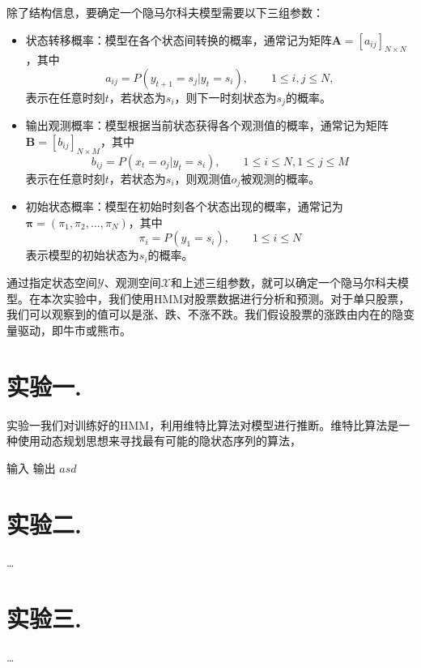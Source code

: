 \documentclass[a4paper,UTF8]{article}
\theoremstyle{definition}
\begin{document}
	除了结构信息，要确定一个隐马尔科夫模型需要以下三组参数：
\begin{itemize}
\item
	状态转移概率：模型在各个状态间转换的概率，通常记为矩阵$\textbf{A}=[a_{ij}]_{N\times N}$，其中
\begin{displaymath}
	a_{ij}=P(y_{t+1}=s_j|y_t=s_i),\qquad 1 \leq i,j \leq N,
\end{displaymath}
表示在任意时刻$t$，若状态为$s_i$，则下一时刻状态为$s_j$的概率。
\item
	输出观测概率：模型根据当前状态获得各个观测值的概率，通常记为矩阵$\textbf{B}=[b_{ij}]_{N\times M}$，其中
\begin{displaymath}
	b_{ij}=P(x_t=o_j|y_t=s_i),\qquad 1 \leq i \leq N, 1\leq j \leq M
\end{displaymath}
表示在任意时刻$t$，若状态为$s_i$，则观测值$o_j$被观测的概率。
\item
     初始状态概率：模型在初始时刻各个状态出现的概率，通常记为$\boldsymbol{\pi}=(\pi_1,\pi_2,...,\pi_N)$，其中
\begin{displaymath}
	\pi_i=P(y_1=s_i),\qquad 1\leq i \leq N
\end{displaymath}
表示模型的初始状态为$s_i$的概率。
\end{itemize}

	通过指定状态空间$\mathcal{Y}$、观测空间$\mathcal{X}$和上述三组参数，就可以确定一个隐马尔科夫模型。在本次实验中，我们使用HMM对股票数据进行分析和预测。对于单只股票，我们可以观察到的值可以是涨、跌、不涨不跌。我们假设股票的涨跌由内在的隐变量驱动，即牛市或熊市。

\section*{实验一.}
	实验一我们对训练好的HMM，利用维特比算法对模型进行推断。维特比算法是一种使用动态规划思想来寻找最有可能的隐状态序列的算法，
\begin{algorithm}
	\begin{algorithmic}
		\Require 输入
		\Ensure 输出
				\State $asd$
			\EndFor
		\EndFunction
	\end{algorithmic}
\end{algorithm}

\section*{实验二.}
	\dots

\section*{实验三. }
	\dots
\end{document}
